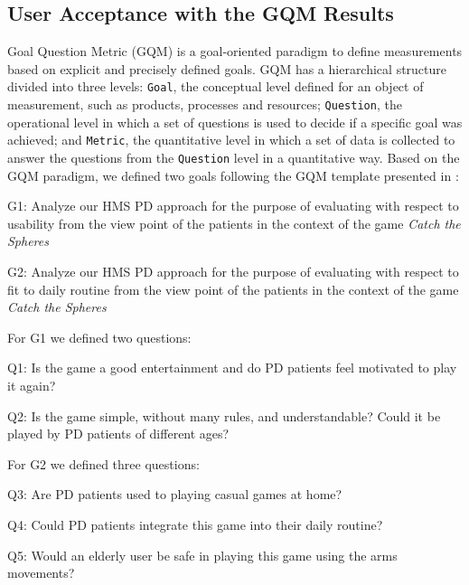 \documentclass[10pt, conference, compsocconf]{IEEEtran}
\begin{document}
\subsection{User Acceptance with the GQM Results}

Goal Question Metric (GQM) \cite{gqmhci2009} is a goal-oriented paradigm to define measurements based on explicit and precisely defined goals. GQM has a hierarchical structure divided into three levels: \texttt{Goal}, the conceptual level defined for an object of measurement, such as products, processes and resources; \texttt{Question}, the operational level in which a set of questions is used to decide if a specific goal was achieved; and \texttt{Metric}, the quantitative level in which a set of data is collected to answer the questions from the \texttt{Question} level in a quantitative way. Based on the GQM paradigm, we defined two goals following the GQM template presented in \cite{gqmhci2009}: 

\begin{compactitem}
	\item G1: Analyze our HMS PD approach for the purpose of evaluating with respect to usability from the view point of the patients in the context of the game \emph{Catch the Spheres}
	\item G2: Analyze our HMS PD approach for the purpose of evaluating with respect to fit to daily routine from the view point of the patients in the context of the game \emph{Catch the Spheres}
\end{compactitem}

For G1 we defined two questions: 

\begin{compactitem}
	\item Q1: Is the game a good entertainment and do PD patients feel motivated to play it again?
	\item Q2: Is the game simple, without many rules, and understandable? Could it be played by PD patients of different ages? 
\end{compactitem}

For G2 we defined three questions:

\begin{compactitem}
	\item Q3: Are PD patients used to playing casual games at home?
	\item Q4: Could PD patients integrate this game into their daily routine?
	\item Q5: Would an elderly user be safe in playing this game using the arms movements?
\end{compactitem}
\end{document}
